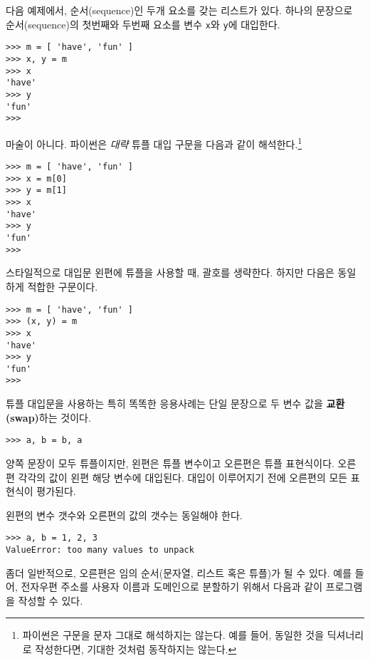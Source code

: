 다음 예제에서, 순서(sequence)인 두개 요소를 갖는 리스트가 있다. 
하나의 문장으로 순서(sequence)의 첫번째와 두번째 요소를 변수 {\tt x}와 {\tt y}에 대입한다. 

\beforeverb
\begin{verbatim}
>>> m = [ 'have', 'fun' ]
>>> x, y = m
>>> x
'have'
>>> y
'fun'
>>> 
\end{verbatim}
\afterverb
%

마술이 아니다. 파이썬은 \emph{대략} 튜플 대입 구문을 다음과 같이 해석한다.\footnote{파이썬은 구문을 문자 그대로 해석하지는 않는다.
예를 들어, 동일한 것을 딕셔너리로 작성한다면, 기대한 것처럼 동작하지는 않는다.}

\beforeverb
\begin{verbatim}
>>> m = [ 'have', 'fun' ]
>>> x = m[0]
>>> y = m[1]
>>> x
'have'
>>> y
'fun'
>>> 
\end{verbatim}
\afterverb

스타일적으로 대입문 왼편에 튜플을 사용할 때, 괄호를 생략한다. 
하지만 다음은 동일하게 적합한 구문이다.

\beforeverb
\begin{verbatim}
>>> m = [ 'have', 'fun' ]
>>> (x, y) = m
>>> x
'have'
>>> y
'fun'
>>> 
\end{verbatim}
\afterverb
%

튜플 대입문을 사용하는 특히 똑똑한 응용사례는 단일 문장으로 두 변수 값을 {\bf 교환(swap)}하는 것이다.

\beforeverb
\begin{verbatim}
>>> a, b = b, a
\end{verbatim}
\afterverb
%

양쪽 문장이 모두 튜플이지만, 왼편은 튜플 변수이고 오른편은 튜플 표현식이다.
오른편 각각의 값이 왼편 해당 변수에 대입된다. 
대입이 이루어지기 전에 오른편의 모든 표현식이 평가된다.

왼편의 변수 갯수와 오른편의 값의 갯수는 동일해야 한다.


\beforeverb
\begin{verbatim}
>>> a, b = 1, 2, 3
ValueError: too many values to unpack
\end{verbatim}
\afterverb
%

좀더 일반적으로, 오른편은 임의 순서(문자열, 리스트 혹은 튜플)가 될 수 있다.
예를 들어, 전자우편 주소를 사용자 이름과 도메인으로 분할하기 위해서 다음과 같이 프로그램을 작성할 수 있다.


